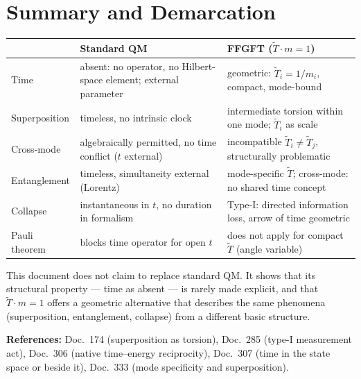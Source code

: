 \section{Summary and Demarcation}

\begin{center}
\begin{tabular}{p{3.2cm}p{4.5cm}p{4.5cm}}
\toprule
 & \textbf{Standard QM} & \textbf{FFGFT ($\tilde{T}\cdot m=1$)} \\
\midrule
Time & absent: no operator, no Hilbert-space element; external
  parameter & geometric: $\tilde{T}_i=1/m_i$, compact, mode-bound \\
Superposition & timeless, no intrinsic clock & intermediate torsion
  within one mode; $\tilde{T}_i$ as scale \\
Cross-mode & algebraically permitted, no time conflict ($t$ external)
  & incompatible $\tilde{T}_i\neq\tilde{T}_j$, structurally
  problematic \\
Entanglement & timeless, simultaneity external (Lorentz) &
  mode-specific $\tilde{T}$; cross-mode: no shared time concept \\
Collapse & instantaneous in $t$, no duration in formalism & Type-I:
  directed information loss, arrow of time geometric \\
Pauli theorem & blocks time operator for open $t$ & does not apply
  for compact $\tilde{T}$ (angle variable) \\
\bottomrule
\end{tabular}
\end{center}

\medskip\noindent
This document does not claim to replace standard QM. It shows that
its structural property — time as absent — is rarely made explicit,
and that $\tilde{T}\cdot m=1$ offers a geometric alternative that
describes the same phenomena (superposition, entanglement, collapse)
from a different basic structure.

\medskip\noindent
\textbf{References:} Doc.~174 (superposition as torsion),
Doc.~285 (type-I measurement act), Doc.~306 (native time--energy
reciprocity), Doc.~307 (time in the state space or beside it),
Doc.~333 (mode specificity and superposition).
